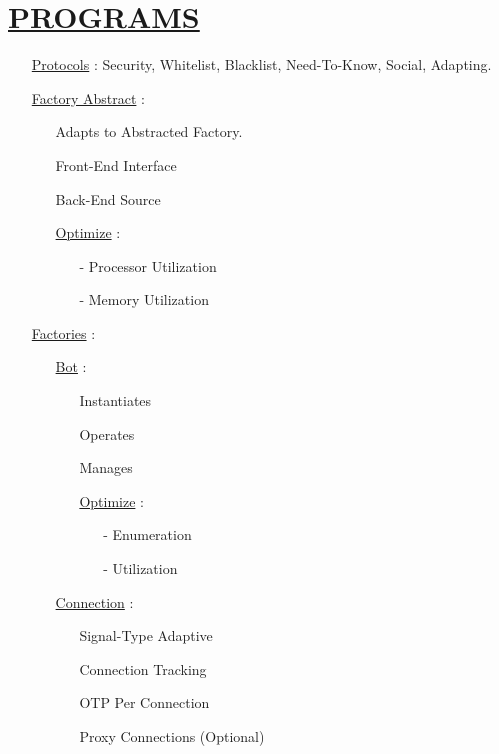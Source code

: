 \documentclass[11pt]{article}
\begin{document}
\section*{\ul{PROGRAMS}}
\begin{enumerate}
	\item[] \ul{Protocols} : Security, Whitelist, Blacklist, Need-To-Know, Social, Adapting.
	
	\item[] \ul{Factory Abstract} :
	\begin{enumerate}
		\item[] Adapts to Abstracted Factory.
		\item[] Front-End Interface
		\item[] Back-End Source
		
		\item[] \ul{Optimize}  :
		\begin{enumerate}
			\item[-] Processor Utilization
			\item[-] Memory Utilization
		\end{enumerate}
	\end{enumerate}

	\item[] \ul{Factories} :
	\begin{enumerate}
		\item[] \ul{Bot} :
		\begin{enumerate}
			\item[] Instantiates
			\item[] Operates
			\item[] Manages
			
			\item[] \ul{Optimize}  :
			\begin{enumerate}
				\item[-] Enumeration
				\item[-] Utilization
			\end{enumerate}
		\end{enumerate}
	
		\item[] \ul{Connection} :
		\begin{enumerate}
			\item[] Signal-Type Adaptive
			\item[] Connection Tracking
			\item[] OTP Per Connection
			\item[] Proxy Connections (Optional)
		\end{enumerate}


\end{enumerate}
\end{enumerate}
\end{document}

